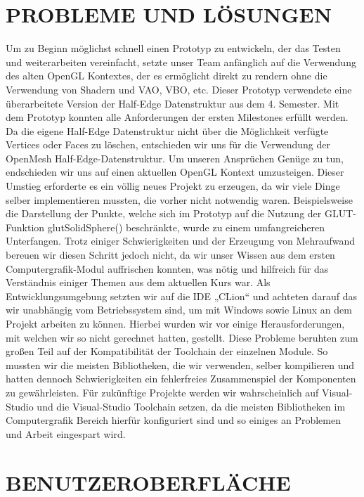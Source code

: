 \section{\Large PROBLEME UND LÖSUNGEN}
Um zu Beginn möglichst schnell einen Prototyp zu entwickeln, der das Testen und weiterarbeiten vereinfacht, setzte unser Team anfänglich auf die Verwendung des alten OpenGL Kontextes, der es ermöglicht direkt zu rendern ohne die Verwendung von Shadern und VAO, VBO, etc. Dieser Prototyp verwendete eine überarbeitete Version der Half-Edge Datenstruktur aus dem 4. Semester. Mit dem Prototyp konnten alle Anforderungen der ersten Milestones erfüllt werden. \newline
Da die eigene Half-Edge Datenstruktur nicht über die Möglichkeit verfügte Vertices oder Faces zu löschen, entschieden wir uns für die Verwendung der OpenMesh Half-Edge-Datenstruktur.\newline
Um unseren Ansprüchen Genüge zu tun, endschieden wir uns auf einen aktuellen OpenGL Kontext umzusteigen. Dieser Umstieg erforderte es ein völlig neues Projekt zu erzeugen, da wir viele Dinge selber implementieren mussten, die vorher nicht notwendig waren. Beispielsweise die Darstellung der Punkte, welche sich im Prototyp auf die Nutzung der GLUT-Funktion glutSolidSphere() beschränkte, wurde zu einem umfangreicheren Unterfangen. Trotz einiger Schwierigkeiten und der Erzeugung von Mehraufwand bereuen wir diesen Schritt jedoch nicht, da wir unser Wissen aus dem ersten Computergrafik-Modul auffrischen konnten, was nötig und hilfreich für das Verständnis einiger Themen aus dem aktuellen Kurs war.\newline
Als Entwicklungsumgebung setzten wir auf die IDE „CLion“ und achteten darauf das wir unabhängig vom Betriebssystem sind, um mit Windows sowie Linux an dem Projekt arbeiten zu können. Hierbei wurden wir vor einige Herausforderungen, mit welchen wir so nicht gerechnet hatten, gestellt. Diese Probleme beruhten zum großen Teil auf der Kompatibilität der Toolchain der einzelnen Module. So mussten wir die meisten Bibliotheken, die wir verwenden, selber kompilieren und hatten dennoch Schwierigkeiten ein fehlerfreies Zusammenspiel der Komponenten zu gewährleisten. Für zukünftige Projekte werden wir wahrscheinlich auf Visual-Studio und die Visual-Studio Toolchain setzen, da die meisten Bibliotheken im Computergrafik Bereich hierfür konfiguriert sind und so einiges an Problemen und Arbeit eingespart wird.

\section{\Large BENUTZEROBERFLÄCHE}


